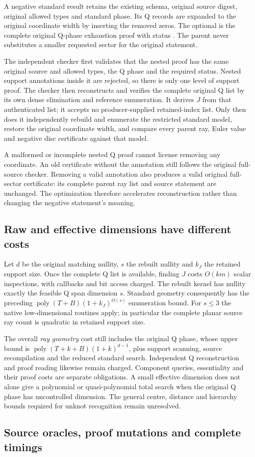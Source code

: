 A negative standard result retains the existing
 schema, original source digest, original
allowed types and standard phase. Its Q records are expanded to the original
coordinate width by inserting the removed zeros. The optional
 is the complete original Q-phase exhaustion
proof with status . The parent never substitutes
a smaller requested sector for the original statement.

The independent checker first validates that the nested proof has the same
original source and allowed types, the Q phase and the required status.
Nested support annotations inside it are rejected, so there is only one
level of support proof. The checker then reconstructs and verifies the
complete original Q list by its own dense elimination and reference
enumeration. It derives $J$ from that authenticated list; it accepts no
producer-supplied retained-index list. Only then does it independently
rebuild and enumerate the restricted standard model, restore the original
coordinate width, and compare every parent ray, Euler value and negative
disc certificate against that model.

A malformed or incomplete nested Q proof cannot license removing any
coordinate. An old certificate without the annotation still follows the
original full-source checker. Removing a valid annotation also produces a
valid original full-sector certificate: its complete parent ray list and
source statement are unchanged. The optimization therefore accelerates
reconstruction rather than changing the negative statement's meaning.

\subsection{Raw and effective dimensions have different costs}

Let $d$ be the original matching nullity, $s$ the rebuilt nullity and $k_J$
the retained support size. Once the complete Q list is available, finding
$J$ costs $O(km)$ scalar inspections, with callbacks and bit access charged.
The rebuilt kernel has nullity exactly the feasible Q span dimension $s$.
Standard geometry consequently has the preceding
$\operatorname{poly}(T+B)(1+k_J)^{O(s)}$ enumeration bound. For $s\le3$ the
native low-dimensional routines apply; in particular the complete planar
source ray count is quadratic in retained support size.

The overall \emph{ray geometry} cost still includes the original Q phase,
whose upper bound is
$\operatorname{poly}(T+k+B)(1+k)^{d-1}$, plus support scanning, source
recompilation and the reduced standard search. Independent Q reconstruction
and proof reading likewise remain charged. Component queries, essentiality
and their proof costs are separate obligations. A small effective dimension
does not alone give a polynomial or quasi-polynomial total search when the
original Q phase has uncontrolled dimension. The general centre, distance
and hierarchy bounds required for unknot recognition remain unresolved.

\subsection{Source oracles, proof mutations and complete timings}

